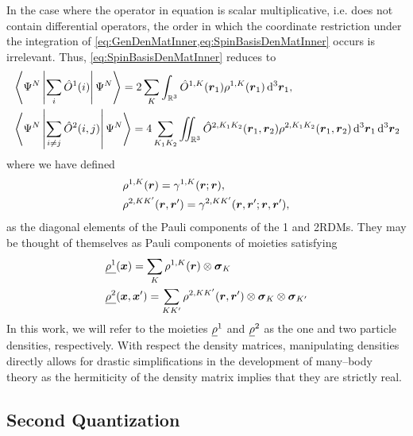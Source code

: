 In the case where the operator in equation is scalar multiplicative, i.e. does not contain differential operators, 
the order in which the coordinate restriction under the integration of \cref{eq:GenDenMatInner,eq:SpinBasisDenMatInner} 
occurs is irrelevant. Thus, \cref{eq:SpinBasisDenMatInner} reduces to \cite{Yang89_book}
\begin{subequations}
\begin{align}
&\left\langle \Psi^N \left\vert \sum_i \hat{O}^1(i) \right\vert \Psi^N \right\rangle = 2 \sum_K \int_{\mathbb R^3}  \hat{O}^{1,K}(\boldsymbol{r}_1) \rho^{1,K}(\boldsymbol{r}_1) 
  \,\mathrm{d}^3\boldsymbol{r}_1,\\
&\left\langle \Psi^N \left\vert \sum_{i\neq j} \hat{O}^2(i,j) \right\vert \Psi^N \right\rangle = 4 \sum_{K_1 K_2} \int\mkern-12mu\int_{\mathbb R^3} 
  \hat{O}^{2,K_1K_2}(\boldsymbol{r}_1,\boldsymbol{r}_2) \rho^{2,K_1 K_2}(\boldsymbol{r}_1,\boldsymbol{r}_2)\,\mathrm{d}^3\boldsymbol{r}_1 \,\mathrm{d}^3\boldsymbol{r}_2
\end{align}
\end{subequations}
where we have defined
\begin{subequations}
\begin{align}
&\rho^{1,K}(\boldsymbol{r}) = \gamma^{1,K}(\boldsymbol{r};\boldsymbol{r}),\\
&\rho^{2,KK'}(\boldsymbol{r},\boldsymbol{r}') = \gamma^{2,KK'}(\boldsymbol{r},\boldsymbol{r}';\boldsymbol{r},\boldsymbol{r}'),
\end{align}
\end{subequations}
as the diagonal elements of the Pauli components of the 1 and 2RDMs. They may be thought of themselves
as Pauli components of moieties satisfying
\begin{align}
&\underline{\rho^1}(\boldsymbol{x}) = \sum_K \rho^{1,K}(\boldsymbol{r}) \otimes \boldsymbol{\sigma}_{K}\\
&\underline{\rho^2}(\boldsymbol{x},\boldsymbol{x}') = \sum_{KK'} \rho^{2,KK'}(\boldsymbol{r},\boldsymbol{r}') \otimes \boldsymbol{\sigma}_{K}\otimes \boldsymbol{\sigma}_{K'}
\end{align} 
In this work, we will refer to
the moieties $\underline{\rho}^{1}$ and $\underline{\rho}^{2}$ as the  one and two particle
densities, respectively.  With respect the density matrices, manipulating densities directly 
allows for drastic simplifications in the development of many--body theory as the hermiticity
of the density matrix implies that they are strictly real.





\subsection{Second Quantization}
\label{sec:SQ}


